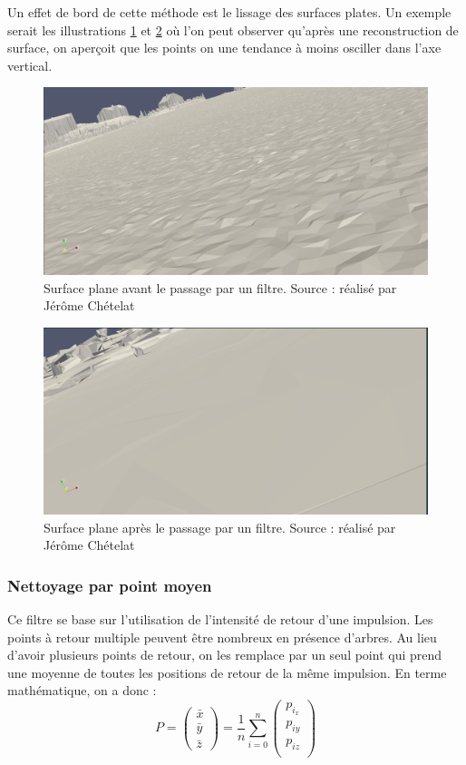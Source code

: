 Un effet de bord de cette méthode est le lissage des surfaces plates. Un exemple serait les illustrations \ref{fig:before_las_filter} et \ref{fig:after_las_filter} où l'on peut observer qu'après une reconstruction de surface, on aperçoit que les points on une tendance à moins osciller dans l'axe vertical.
\begin{figure}[htbp!]
    \centering
    \includegraphics[width=0.8\linewidth]{figures/lissage_brut.png}
    \caption{Surface plane avant le passage par un filtre. Source : réalisé par Jérôme Chételat}
    \label{fig:before_las_filter}
\end{figure}
\begin{figure}[htbp!]
    \centering
    \includegraphics[width=0.8\linewidth]{figures/lissage_filtrer.png}
    \caption{Surface plane après le passage par un filtre. Source : réalisé par Jérôme Chételat}
    \label{fig:after_las_filter}
\end{figure}

\subsubsection{Nettoyage par point moyen}

Ce filtre se base sur l'utilisation de l'intensité de retour d'une impulsion. Les points à retour multiple peuvent être nombreux en présence d'arbres. Au lieu d'avoir plusieurs points de retour, on les remplace par un seul point qui prend une moyenne de toutes les positions de retour de la même impulsion. En terme mathématique, on a donc : 
$$
P = 
\begin{pmatrix}
    \bar{x} \\
    \bar{y} \\
    \bar{z}
\end{pmatrix}
=
\frac{1}{n}
\sum_{i=0}^{n}
\begin{pmatrix}
   p_{i_x} \\
   p_{iy} \\
   p_{iz} \\
\end{pmatrix}
$$

